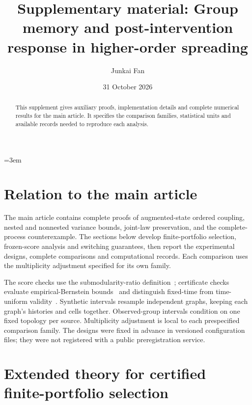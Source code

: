 \documentclass[preprint,11pt,sort&compress]{elsarticle}
\date{31 October 2026}
\begin{document}
\begin{frontmatter}
\title{Supplementary material: Group memory and post-intervention response in higher-order spreading}
\author[neu]{Junkai Fan}
\begin{abstract}
This supplement gives auxiliary proofs, implementation details and complete numerical results for the main article. It specifies the comparison families, statistical units and available records needed to reproduce each analysis.
\end{abstract}
\end{frontmatter}
\emergencystretch=3em
\FloatBarrier\section{Relation to the main article}
The main article contains complete proofs of augmented-state ordered coupling, nested and nonnested variance bounds, joint-law preservation, and the complete-process counterexample. The sections below develop finite-portfolio selection, frozen-score analysis and switching guarantees, then report the experimental designs, complete comparisons and computational records. Each comparison uses the multiplicity adjustment specified for its own family.

The score checks use the submodularity-ratio definition~\cite{das2018}; certificate checks evaluate empirical-Bernstein bounds~\cite{maurer2009} and distinguish fixed-time from time-uniform validity~\cite{howard2021}. Synthetic intervals resample independent graphs, keeping each graph's histories and cells together. Observed-group intervals condition on one fixed topology per source. Multiplicity adjustment is local to each prespecified comparison family. The designs were fixed in advance in versioned configuration files; they were not registered with a public preregistration service.

\FloatBarrier\section{Extended theory for certified finite-portfolio selection}\label{sec:extended_selection}
\end{document}
